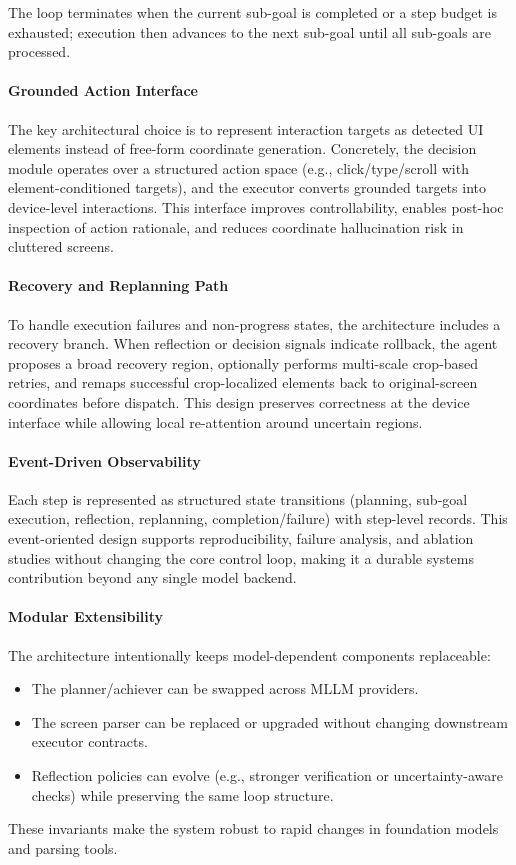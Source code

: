 The loop terminates when the current sub-goal is completed or a step budget is exhausted; execution then advances to the next sub-goal until all sub-goals are processed.

\paragraph{Grounded Action Interface}
The key architectural choice is to represent interaction targets as detected UI elements instead of free-form coordinate generation. Concretely, the decision module operates over a structured action space (e.g., click/type/scroll with element-conditioned targets), and the executor converts grounded targets into device-level interactions. This interface improves controllability, enables post-hoc inspection of action rationale, and reduces coordinate hallucination risk in cluttered screens.

\paragraph{Recovery and Replanning Path}
To handle execution failures and non-progress states, the architecture includes a recovery branch. When reflection or decision signals indicate rollback, the agent proposes a broad recovery region, optionally performs multi-scale crop-based retries, and remaps successful crop-localized elements back to original-screen coordinates before dispatch. This design preserves correctness at the device interface while allowing local re-attention around uncertain regions.

\paragraph{Event-Driven Observability}
Each step is represented as structured state transitions (planning, sub-goal execution, reflection, replanning, completion/failure) with step-level records. This event-oriented design supports reproducibility, failure analysis, and ablation studies without changing the core control loop, making it a durable systems contribution beyond any single model backend.

\paragraph{Modular Extensibility}
The architecture intentionally keeps model-dependent components replaceable:
\begin{itemize}
    \item The planner/achiever can be swapped across MLLM providers.
    \item The screen parser can be replaced or upgraded without changing downstream executor contracts.
    \item Reflection policies can evolve (e.g., stronger verification or uncertainty-aware checks) while preserving the same loop structure.
\end{itemize}
These invariants make the system robust to rapid changes in foundation models and parsing tools.

